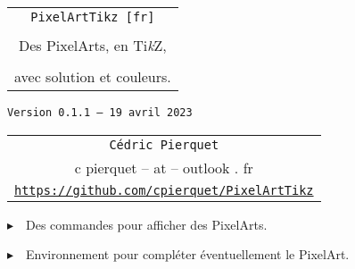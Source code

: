 \documentclass{article}
\def\TPversion{0.1.1}
\def\TPdate{19 avril 2023}
\begin{document}
\pagestyle{fancy}

\thispagestyle{empty}

\vspace{2cm}

\begin{center}
	\begin{minipage}{0.75\linewidth}
	\begin{tcolorbox}[colframe=yellow,colback=yellow!15]
		\begin{center}
			\begin{tabular}{c}
				{\Huge \texttt{PixelArtTikz [fr]}}\\
				\\
				{\LARGE Des PixelArts, en Ti\textit{k}Z}, \\
				\\
				{\LARGE avec solution et couleurs.} \\
			\end{tabular}
			
			\medskip
			
			{\small \texttt{Version \TPversion{} -- \TPdate}}
		\end{center}
	\end{tcolorbox}
\end{minipage}
\end{center}

\vspace{0.5cm}

\begin{center}
	\begin{tabular}{c}
	\texttt{Cédric Pierquet}\\
	{\ttfamily c pierquet -- at -- outlook . fr}\\
	\texttt{\url{https://github.com/cpierquet/PixelArtTikz}}
\end{tabular}
\end{center}

\vspace{0.25cm}

{$\blacktriangleright$~~Des commandes pour afficher des PixelArts.}

\smallskip

{$\blacktriangleright$~~Environnement pour compléter éventuellement le PixelArt.}

\smallskip

\vspace{1cm}
\end{document}

